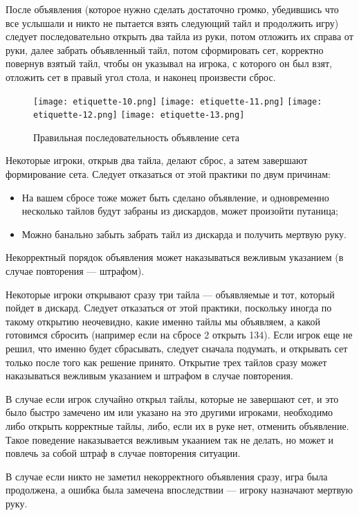 После объявления (которое нужно сделать достаточно громко, убедившись что все услышали и никто не пытается взять следующий тайл и продолжить игру) следует последовательно открыть два тайла из руки, потом отложить их справа от руки, далее забрать объявленный тайл, потом сформировать сет, корректно повернув взятый тайл, чтобы он указывал на игрока, с которого он был взят, отложить сет в правый угол стола, и наконец произвести сброс.

\begin{figure}[H]
	\centering
	\texttt{[image: etiquette-10.png]}
	\texttt{[image: etiquette-11.png]}
	\texttt{[image: etiquette-12.png]}
	\texttt{[image: etiquette-13.png]}
	\caption{Правильная последовательность объявление сета}
\end{figure}

Некоторые игроки, открыв два тайла, делают сброс, а затем завершают формирование сета. Следует отказаться от этой практики по двум причинам:
\begin{itemize}
	\item На вашем сбросе тоже может быть сделано объявление, и одновременно несколько тайлов будут забраны из дискардов, может произойти путаница;
	\item Можно банально забыть забрать тайл из дискарда и получить мертвую руку.
\end{itemize}

Некорректный порядок объявления может наказываться вежливым указанием (в случае повторения --- штрафом).

Некоторые игроки открывают сразу три тайла --- объявляемые и тот, который пойдет в дискард. Следует отказаться от этой практики, поскольку иногда по такому открытию неочевидно, какие именно тайлы мы объявляем, а какой готовимся сбросить (например если на сбросе 2 открыть 134). Если игрок еще не решил, что именно будет сбрасывать, следует сначала подумать, и открывать сет только после того как решение принято. Открытие трех тайлов сразу может наказываться вежливым указанием и штрафом в случае повторения.

В случае если игрок случайно открыл тайлы, которые не завершают сет, и это было быстро замечено им или указано на это другими игроками, необходимо либо открыть корректные тайлы, либо, если их в руке нет, отменить объявление. Такое поведение наказывается вежливым укаанием так не делать, но может и повлечь за собой штраф в случае повторения ситуации.

В случае если никто не заметил некорректного объявления сразу, игра была продолжена, а ошибка была замечена впоследствии --- игроку назначают мертвую руку.

